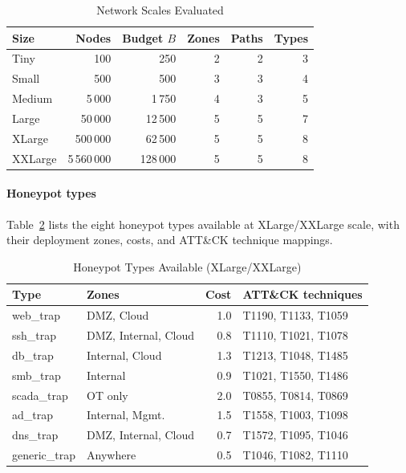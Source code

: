 \documentclass[journal]{IEEEtran}
\begin{document}
\begin{table}[!htb]
\caption{Network Scales Evaluated}
\label{tab:scales}
\centering
\renewcommand{\arraystretch}{1.2}
\begin{tabular}{lrrrrr}
\toprule
Size & Nodes & Budget $B$ & Zones & Paths & Types \\
\midrule
Tiny    & 100            & 250      & 2 & 2 & 3 \\
Small   & 500            & 500      & 3 & 3 & 4 \\
Medium  & 5\,000         & 1\,750   & 4 & 3 & 5 \\
Large   & 50\,000        & 12\,500  & 5 & 5 & 7 \\
XLarge  & 500\,000       & 62\,500  & 5 & 5 & 8 \\
XXLarge & 5\,560\,000    & 128\,000 & 5 & 5 & 8 \\
\bottomrule
\end{tabular}
\end{table}

\paragraph{Honeypot types}
Table~\ref{tab:hptypes} lists the eight honeypot types available at
XLarge/XXLarge scale, with their deployment zones, costs, and
ATT\&CK technique mappings.

\begin{table}[!htb]
\caption{Honeypot Types Available (XLarge/XXLarge)}
\label{tab:hptypes}
\centering
\renewcommand{\arraystretch}{1.2}
\begin{tabular}{llrl}
\toprule
Type & Zones & Cost & ATT\&CK techniques \\
\midrule
web\_trap    & DMZ, Cloud           & 1.0 & T1190, T1133, T1059 \\
ssh\_trap    & DMZ, Internal, Cloud & 0.8 & T1110, T1021, T1078 \\
db\_trap     & Internal, Cloud      & 1.3 & T1213, T1048, T1485 \\
smb\_trap    & Internal             & 0.9 & T1021, T1550, T1486 \\
scada\_trap  & OT only              & 2.0 & T0855, T0814, T0869 \\
ad\_trap     & Internal, Mgmt.      & 1.5 & T1558, T1003, T1098 \\
dns\_trap    & DMZ, Internal, Cloud & 0.7 & T1572, T1095, T1046 \\
generic\_trap& Anywhere             & 0.5 & T1046, T1082, T1110 \\
\bottomrule
\end{tabular}
\end{table}
\end{document}
